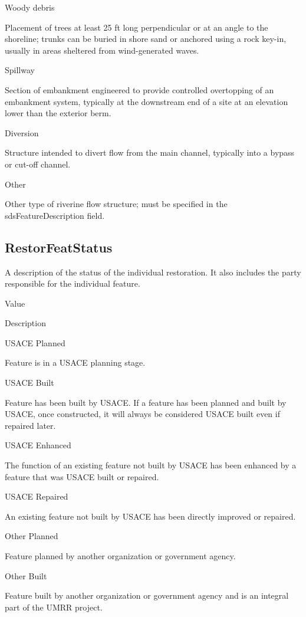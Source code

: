 \documentclass[
  letterpaper,
  DIV=11,
  numbers=noendperiod]{scrreprt}
\begin{document}
Woody debris

Placement of trees at least 25 ft long perpendicular or at an angle to
the shoreline; trunks can be buried in shore sand or anchored using a
rock key-in, usually in areas sheltered from wind-generated waves.

Spillway

Section of embankment engineered to provide controlled overtopping of an
embankment system, typically at the downstream end of a site at an
elevation lower than the exterior berm.

Diversion

Structure intended to divert flow from the main channel, typically into
a bypass or cut-off channel.

Other

Other type of riverine flow structure; must be specified in the
sdsFeatureDescription field.

\subsection{RestorFeatStatus}\label{restorfeatstatus-13}

A description of the status of the individual restoration. It also
includes the party responsible for the individual feature.

Value

Description

USACE Planned

Feature is in a USACE planning stage.

USACE Built

Feature has been built by USACE. If a feature has been planned and built
by USACE, once constructed, it will always be considered USACE built
even if repaired later.

USACE Enhanced

The function of an existing feature not built by USACE has been enhanced
by a feature that was USACE built or repaired.

USACE Repaired

An existing feature not built by USACE has been directly improved or
repaired.

Other Planned

Feature planned by another organization or government agency.

Other Built

Feature built by another organization or government agency and is an
integral part of the UMRR project.
\end{document}

